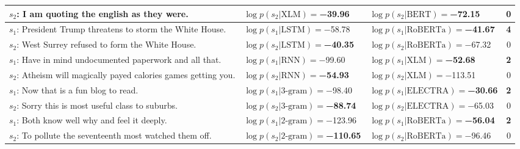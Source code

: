 \begin{tabularx}{\textwidth}{lllc}
                          $s_2$: I am quoting the english as they were. &      $\log p(s_2 | \textrm{XLM})=$\textbf{\num{-39.96}} &              $\log p(s_2 | \textrm{BERT})=$\num{-72.15} &           \num{0} \\\midrule
             $s_1$: President Trump threatens to storm the White House. &              $\log p(s_1 | \textrm{LSTM})=$\num{-58.78} &  $\log p(s_1 | \textrm{RoBERTa})=$\textbf{\num{-41.67}} &  \textbf{\num{4}} \\
                    $s_2$: West Surrey refused to form the White House. &     $\log p(s_2 | \textrm{LSTM})=$\textbf{\num{-40.35}} &           $\log p(s_2 | \textrm{RoBERTa})=$\num{-67.32} &           \num{0} \\\midrule
               $s_1$: Have in mind undocumented paperwork and all that. &               $\log p(s_1 | \textrm{RNN})=$\num{-99.60} &      $\log p(s_1 | \textrm{XLM})=$\textbf{\num{-52.68}} &  \textbf{\num{2}} \\
        $s_2$: Atheism will magically payed calories games getting you. &      $\log p(s_2 | \textrm{RNN})=$\textbf{\num{-54.93}} &              $\log p(s_2 | \textrm{XLM})=$\num{-113.51} &           \num{0} \\\midrule
                                 $s_1$: Now that is a fun blog to read. &            $\log p(s_1 | \textrm{3-gram})=$\num{-98.40} &  $\log p(s_1 | \textrm{ELECTRA})=$\textbf{\num{-30.66}} &  \textbf{\num{2}} \\
                     $s_2$: Sorry this is most useful class to suburbs. &   $\log p(s_2 | \textrm{3-gram})=$\textbf{\num{-88.74}} &           $\log p(s_2 | \textrm{ELECTRA})=$\num{-65.03} &           \num{0} \\\midrule
                          $s_1$: Both know well why and feel it deeply. &           $\log p(s_1 | \textrm{2-gram})=$\num{-123.96} &  $\log p(s_1 | \textrm{RoBERTa})=$\textbf{\num{-56.04}} &  \textbf{\num{2}} \\
               $s_2$: To pollute the seventeenth most watched them off. &  $\log p(s_2 | \textrm{2-gram})=$\textbf{\num{-110.65}} &           $\log p(s_2 | \textrm{RoBERTa})=$\num{-96.46} &           \num{0} \\
\bottomrule
\end{tabularx}
